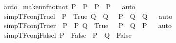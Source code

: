 \begin{isabellebody}
%
\isatagproof
{}\isamarkupfalse%
\ auto%
\endisatagproof
{\isafoldproof}%
%
\isadelimproof
%
\endisadelimproof
\isanewline
{}\isamarkupfalse%
\ make{\isacharunderscore}{\kern0pt}nnf{\isacharunderscore}{\kern0pt}not{\isacharunderscore}{\kern0pt}not{\isacharcolon}{\kern0pt}\ {\isachardoublequoteopen}P\ {\isacharequal}{\kern0pt}\ P{\isacharprime}{\kern0pt}\ {\isacharequal}{\kern0pt}{\isacharequal}{\kern0pt}{\isachargreater}{\kern0pt}\ {\isacharparenleft}{\kern0pt}{\isasymnot}{\isasymnot}P{\isacharparenright}{\kern0pt}\ {\isacharequal}{\kern0pt}\ P{\isacharprime}{\kern0pt}{\isachardoublequoteclose}%
\isadelimproof
\ %
\endisadelimproof
%
\isatagproof
{}\isamarkupfalse%
\ auto%
\endisatagproof
{\isafoldproof}%
%
\isadelimproof
%
\endisadelimproof
\isanewline
\isanewline
{}\isamarkupfalse%
\ simp{\isacharunderscore}{\kern0pt}TF{\isacharunderscore}{\kern0pt}conj{\isacharunderscore}{\kern0pt}True{\isacharunderscore}{\kern0pt}l{\isacharcolon}{\kern0pt}\ {\isachardoublequoteopen}{\isacharbrackleft}{\kern0pt}{\isacharbar}{\kern0pt}\ P\ {\isacharequal}{\kern0pt}\ True{\isacharsemicolon}{\kern0pt}\ Q\ {\isacharequal}{\kern0pt}\ Q{\isacharprime}{\kern0pt}\ {\isacharbar}{\kern0pt}{\isacharbrackright}{\kern0pt}\ {\isacharequal}{\kern0pt}{\isacharequal}{\kern0pt}{\isachargreater}{\kern0pt}\ {\isacharparenleft}{\kern0pt}P\ {\isasymand}\ Q{\isacharparenright}{\kern0pt}\ {\isacharequal}{\kern0pt}\ Q{\isacharprime}{\kern0pt}{\isachardoublequoteclose}%
\isadelimproof
\ %
\endisadelimproof
%
\isatagproof
{}\isamarkupfalse%
\ auto%
\endisatagproof
{\isafoldproof}%
%
\isadelimproof
%
\endisadelimproof
\isanewline
{}\isamarkupfalse%
\ simp{\isacharunderscore}{\kern0pt}TF{\isacharunderscore}{\kern0pt}conj{\isacharunderscore}{\kern0pt}True{\isacharunderscore}{\kern0pt}r{\isacharcolon}{\kern0pt}\ {\isachardoublequoteopen}{\isacharbrackleft}{\kern0pt}{\isacharbar}{\kern0pt}\ P\ {\isacharequal}{\kern0pt}\ P{\isacharprime}{\kern0pt}{\isacharsemicolon}{\kern0pt}\ Q\ {\isacharequal}{\kern0pt}\ True\ {\isacharbar}{\kern0pt}{\isacharbrackright}{\kern0pt}\ {\isacharequal}{\kern0pt}{\isacharequal}{\kern0pt}{\isachargreater}{\kern0pt}\ {\isacharparenleft}{\kern0pt}P\ {\isasymand}\ Q{\isacharparenright}{\kern0pt}\ {\isacharequal}{\kern0pt}\ P{\isacharprime}{\kern0pt}{\isachardoublequoteclose}%
\isadelimproof
\ %
\endisadelimproof
%
\isatagproof
{}\isamarkupfalse%
\ auto%
\endisatagproof
{\isafoldproof}%
%
\isadelimproof
%
\endisadelimproof
\isanewline
{}\isamarkupfalse%
\ simp{\isacharunderscore}{\kern0pt}TF{\isacharunderscore}{\kern0pt}conj{\isacharunderscore}{\kern0pt}False{\isacharunderscore}{\kern0pt}l{\isacharcolon}{\kern0pt}\ {\isachardoublequoteopen}P\ {\isacharequal}{\kern0pt}\ False\ {\isacharequal}{\kern0pt}{\isacharequal}{\kern0pt}{\isachargreater}{\kern0pt}\ {\isacharparenleft}{\kern0pt}P\ {\isasymand}\ Q{\isacharparenright}{\kern0pt}\ {\isacharequal}{\kern0pt}\ False{\isachardoublequoteclose}%

\end{isabellebody}
